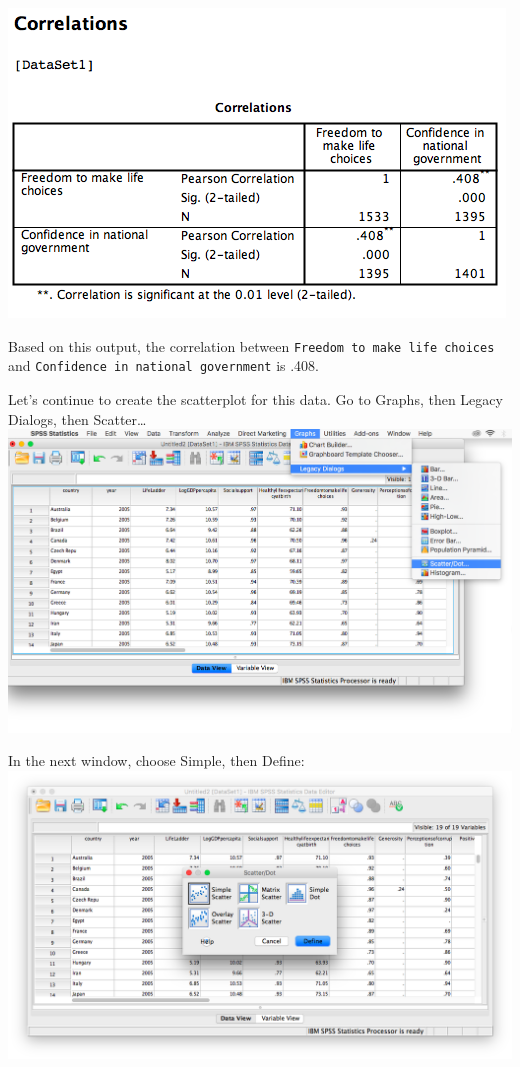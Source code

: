 \documentclass[
]{book}
\begin{document}
\includegraphics{img/3.4.21.png}

Based on this output, the correlation between \texttt{Freedom\ to\ make\ life\ choices} and \texttt{Confidence\ in\ national\ government} is .408.

Let's continue to create the scatterplot for this data. Go to {Graphs}, then {Legacy Dialogs}, then {Scatter\ldots{}}
\includegraphics{img/3.4.22.png}

In the next window, choose {Simple}, then {Define}:
\includegraphics{img/3.4.23.png}
\end{document}
